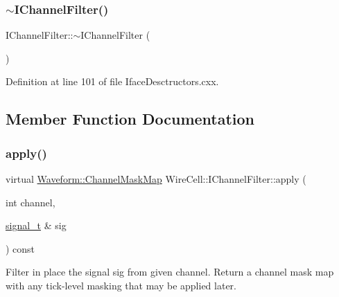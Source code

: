 \subsubsection{\texorpdfstring{$\sim$\+I\+Channel\+Filter()}{~IChannelFilter()}}
{\footnotesize\ttfamily I\+Channel\+Filter\+::$\sim$\+I\+Channel\+Filter (\begin{DoxyParamCaption}{ }\end{DoxyParamCaption})\hspace{0.3cm}{\ttfamily [virtual]}}



Definition at line 101 of file Iface\+Desctructors.\+cxx.



\subsection{Member Function Documentation}
\mbox{\label{class_wire_cell_1_1_i_channel_filter_a6981186ee38a4b9b66e16c0d9b376b08}} 
\subsubsection{\texorpdfstring{apply()}{apply()}\hspace{0.1cm}{\footnotesize\ttfamily [1/2]}}
{\footnotesize\ttfamily virtual \hyperlink{namespace_wire_cell_1_1_waveform_a18b9ae61c858e340252ba3ac83ac3bc0}{Waveform\+::\+Channel\+Mask\+Map} Wire\+Cell\+::\+I\+Channel\+Filter\+::apply (\begin{DoxyParamCaption}\item[{int}]{channel,  }\item[{\hyperlink{class_wire_cell_1_1_i_channel_filter_a434ed96cc4b805fa0eeec14f9f8d85e9}{signal\+\_\+t} \&}]{sig }\end{DoxyParamCaption}) const\hspace{0.3cm}{\ttfamily [pure virtual]}}

Filter in place the signal {\ttfamily sig} from given {\ttfamily channel}. Return a channel mask map with any tick-\/level masking that may be applied later. 

